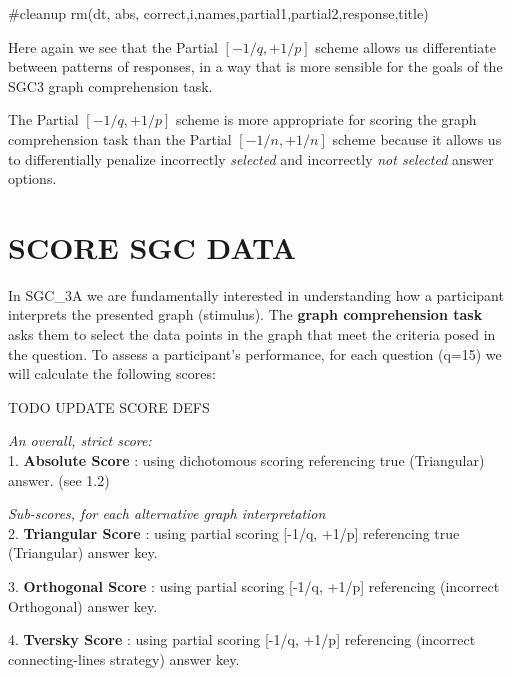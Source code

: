 \documentclass[
  letterpaper,
  DIV=11,
  numbers=noendperiod]{scrreprt}
\newenvironment{Shaded}{\begin{snugshade}}{\end{snugshade}}
\newcommand{\CommentTok}[1]{\textcolor[rgb]{0.37,0.37,0.37}{#1}}
\newcommand{\FunctionTok}[1]{\textcolor[rgb]{0.28,0.35,0.67}{#1}}
\newcommand{\NormalTok}[1]{\textcolor[rgb]{0.00,0.23,0.31}{#1}}
\begin{document}
\begin{Shaded}
\begin{Highlighting}[]
\CommentTok{\#cleanup}
\FunctionTok{rm}\NormalTok{(dt, abs, correct,i,names,partial1,partial2,response,title)}
\end{Highlighting}
\end{Shaded}

Here again we see that the Partial \([-1/q, +1/p]\) scheme allows us
differentiate between patterns of responses, in a way that is more
sensible for the goals of the SGC3 graph comprehension task.

\begin{tcolorbox}[standard jigsaw, colframe=quarto-callout-color-frame, arc=.35mm, bottomrule=.15mm, opacityback=0, rightrule=.15mm, toprule=.15mm, leftrule=.75mm, left=2mm, colback=white]
The Partial \([-1/q, +1/p]\) scheme is more appropriate for scoring the
graph comprehension task than the Partial \([-1/n, +1/n]\) scheme
because it allows us to differentially penalize incorrectly
\emph{selected} and incorrectly \emph{not selected} answer options.
\end{tcolorbox}

\hypertarget{score-sgc-data}{%
\section{SCORE SGC DATA}\label{score-sgc-data}}

In SGC\_3A we are fundamentally interested in understanding how a
participant interprets the presented graph (stimulus). The \textbf{graph
comprehension task} asks them to select the data points in the graph
that meet the criteria posed in the question. To assess a participant's
performance, for each question (q=15) we will calculate the following
scores:

TODO UPDATE SCORE DEFS

\emph{An overall, strict score:}\\
1. \textbf{Absolute Score} : using dichotomous scoring referencing true
(Triangular) answer. (see 1.2)

\emph{Sub-scores, for each alternative graph interpretation}\\
2. \textbf{Triangular Score} : using partial scoring {[}-1/q, +1/p{]}
referencing true (Triangular) answer key.

3. \textbf{Orthogonal Score} : using partial scoring {[}-1/q, +1/p{]}
referencing (incorrect Orthogonal) answer key.

4. \textbf{Tversky Score} : using partial scoring {[}-1/q, +1/p{]}
referencing (incorrect connecting-lines strategy) answer key.
\end{document}
